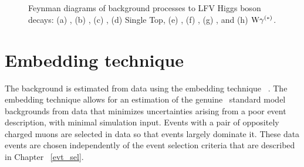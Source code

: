 \begin{figure}[htbp!]
  \hspace{0.5cm}
  \\
  \vspace{1cm}
  \hspace{0.5cm}
  \\
  \caption{Feynman diagrams of background processes to LFV Higgs boson decays: (a) \Htt, (b) \Ztt, (c) \ttbar, (d) Single Top, (e) \PW{}\PW, (f) \PW{}\PZ, (g) \PZ{}\PZ, and (h) $\text{W}\gamma^{(\ast)}$.}
  \label{fig:feynman_bkg}
\end{figure}

\section{Embedding technique}
The \Ztt background is estimated from data using the embedding technique ~\cite{Sirunyan:2019drn}. The embedding technique allows for an estimation of the genuine \Pgt{}\Pgt\, standard model backgrounds from data that minimizes uncertainties arising from a poor event description, with minimal simulation input. Events with a pair of oppositely charged muons are selected in data so that \Zmm events largely dominate it. These data events are chosen independently of the event selection criteria that are described in Chapter ~\ref{evt_sel}.


